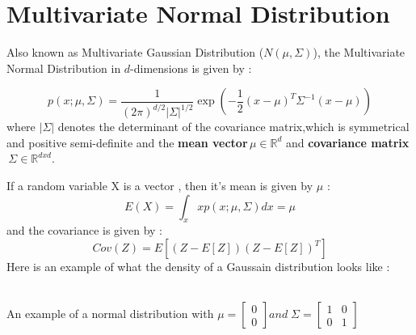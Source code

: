 \documentclass[a4paper,12pt,reqno]{amsart}
\begin{document}

\section{Multivariate Normal Distribution}
\begin{flushleft}
Also known as Multivariate Gaussian Distribution (${N(\mu,\Sigma)}$), the Multivariate Normal Distribution in $d$-dimensions is given by :

\begin{equation} \label{eq7}
p(x;\mu,\Sigma) = {\frac{1}{(2\pi)^{d/2}|\Sigma|^{1/2}} \exp\left(-\frac{1}{2}(x-\mu)^T \Sigma^{-1} (x-\mu)\right)}
\end{equation}
 where $|\Sigma|$ denotes the determinant of the covariance matrix,which is symmetrical and positive semi-definite and the \textbf{mean vector}$\, \mu \in \mathbb{R}^d$ and \textbf{covariance matrix}$\, \Sigma \in \mathbb{R}^{dxd}$.
 
If a random variable X is a vector , then it's mean is given by $\mu$ : 
\begin{equation} \label{eq8}
E(X) = \int_{x} x p(x;\mu,\Sigma) dx = \mu
\end{equation} 
and the covariance is given by :
\begin{equation} \label{eq9}
Cov(Z) = E[(Z-E[Z])(Z-E[Z])^T]
\end{equation} 
Here is an example of what the density of a Gaussain distribution looks like :\newline

\begin{center}
\def\centerx{0}
\def\centery{0}

\\
An example of a normal distribution with $\mu = 
\begin{bmatrix}
0  \\
0 
\end{bmatrix}
 and \; \Sigma =  
\begin{bmatrix}
1 & 0 \\
0 & 1
\end{bmatrix}
$
\end{center}
\end{flushleft}
\end{document}
